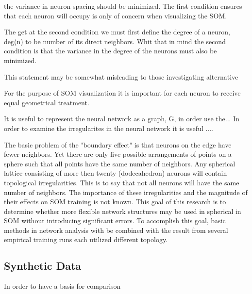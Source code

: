 \documentclass[11pt]{article}
\begin{document}



the variance in neuron spacing should be minimized.    The first condition ensures that each neuron will occupy is only of concern when visualizing the SOM.



The get at the second condition we must first define the degree of a neuron, deg(n) to be number of its direct neighbors.  Whit that in mind the second condition is that the variance in the degree of the neurons must also be minimized.


This statement may be somewhat misleading to those investigating alternative 


For the purpose of SOM visualization it is important for each neuron to receive equal geometrical treatment.


It is useful to represent the neural network as a graph, G, in order use the...
In order to examine the irregularites in the neural network it is useful ....



The basic problem of the "boundary effect" is that neurons on the edge have
fewer neighbors. Yet there are only five possible arrangements of points on a
sphere such that all points have the same number of neighbors.  Any spherical
lattice consisting of more then twenty (dodecahedron) neurons will contain
topological irregularities.  This is to say that not all neurons will have the
same number of neighbors.  The importance of these irregularities and the 
magnitude of their effects on SOM training is not known.  This goal of this research
is to determine whether more flexible network structures may be used in spherical 
in SOM without introducing significant errors. To accomplish this goal, basic methods 
in network analysis with be combined with the result from several empirical training
runs each utilized different topology.  

\subsection{Synthetic Data}
In order to have a basis for comparison 




\end{document}
